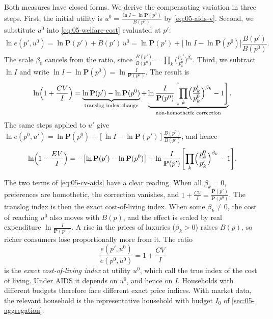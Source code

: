 Both measures have closed forms. We derive the compensating variation in three steps. First, the initial
utility is $u^0 = \frac{\ln I - \ln\mathbf{P}(p^0)}{B(p^0)}$ by \eqref{eq:05-aids-v}. Second, we
substitute $u^0$ into \eqref{eq:05-welfare-cost} evaluated at $p'$:
\begin{equation*}
  \ln e(p',u^0) = \ln\mathbf{P}(p') + B(p')\,u^0
  = \ln\mathbf{P}(p') + \bigl[\ln I - \ln\mathbf{P}(p^0)\bigr]\frac{B(p')}{B(p^0)}.
\end{equation*}
The scale $\beta_0$ cancels from the ratio, since $\frac{B(p')}{B(p^0)} = \prod_k \bigl(\frac{p_k'}{p_k^0}\bigr)^{\beta_k}$.
Third, we subtract $\ln I$ and write $\ln I - \ln\mathbf{P}(p^0) = \ln\frac{I}{\mathbf{P}(p^0)}$. The result is
\begin{equation}\label{eq:05-cv-aids}
  \ln\Bigl(1 + \frac{CV}{I}\Bigr)
  = \underbrace{\ln\mathbf{P}(p') - \ln\mathbf{P}(p^0)}_{\text{translog index change}}
  + \underbrace{\ln\frac{I}{\mathbf{P}(p^0)}\Biggl[\prod_k\Bigl(\frac{p_k'}{p_k^0}\Bigr)^{\beta_k} - 1\Biggr]}_{\text{non-homothetic correction}}.
\end{equation}
The same steps applied to $u'$ give $\ln e(p^0,u') = \ln\mathbf{P}(p^0) + [\ln I - \ln\mathbf{P}(p')]\frac{B(p^0)}{B(p')}$,
and hence
\begin{equation}\label{eq:05-ev-aids}
  \ln\Bigl(1 - \frac{EV}{I}\Bigr)
  = -\bigl[\ln\mathbf{P}(p') - \ln\mathbf{P}(p^0)\bigr]
  + \ln\frac{I}{\mathbf{P}(p')}\Biggl[\prod_k\Bigl(\frac{p_k^0}{p_k'}\Bigr)^{\beta_k} - 1\Biggr].
\end{equation}

The two terms of \eqref{eq:05-cv-aids} have a clear reading. When all $\beta_k = 0$, preferences are homothetic,
the correction vanishes, and $1 + \frac{CV}{I} = \frac{\mathbf{P}(p')}{\mathbf{P}(p^0)}$. The translog index is
then the exact cost-of-living index. When some $\beta_k \neq 0$, the cost of reaching $u^0$ also moves with
$B(p)$, and the effect is scaled by real expenditure $\ln\frac{I}{\mathbf{P}(p^0)}$. A rise in the prices of
luxuries ($\beta_k > 0$) raises $B(p)$, so richer consumers lose proportionally more from it. The ratio
\begin{equation*}
  \frac{e(p',u^0)}{e(p^0,u^0)} = 1 + \frac{CV}{I}
\end{equation*}
is the \emph{exact cost-of-living index} at utility $u^0$, which \citet[\S 7.1, eq.~1.2,
p.~170]{DeatonMuellbauer1980b} call the true index of the cost of living. Under AIDS it depends on $u^0$,
and hence on $I$. Households with different budgets therefore face different exact price indices. With
market data, the relevant household is the representative household with budget $I_0$ of
\cref{sec:05-aggregation}.

